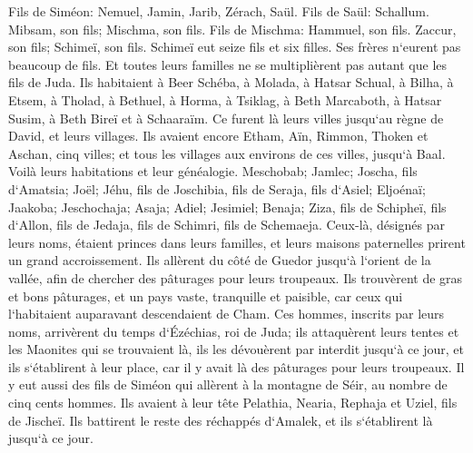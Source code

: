 \verse Fils de Siméon: Nemuel, Jamin, Jarib, Zérach, Saül. 
\verse Fils de Saül: Schallum. Mibsam, son fils; Mischma, son fils. 
\verse Fils de Mischma: Hammuel, son fils. Zaccur, son fils; Schimeï, son fils. 
\verse Schimeï eut seize fils et six filles. Ses frères n`eurent pas beaucoup de fils. Et toutes leurs familles ne se multiplièrent pas autant que les fils de Juda. 
\verse Ils habitaient à Beer Schéba, à Molada, à Hatsar Schual, 
\verse à Bilha, à Etsem, à Tholad, 
\verse à Bethuel, à Horma, à Tsiklag, 
\verse à Beth Marcaboth, à Hatsar Susim, à Beth Bireï et à Schaaraïm. Ce furent là leurs villes jusqu`au règne de David, et leurs villages. 
\verse Ils avaient encore Etham, Aïn, Rimmon, Thoken et Aschan, cinq villes; 
\verse et tous les villages aux environs de ces villes, jusqu`à Baal. Voilà leurs habitations et leur généalogie. 
\verse Meschobab; Jamlec; Joscha, fils d`Amatsia; 
\verse Joël; Jéhu, fils de Joschibia, fils de Seraja, fils d`Asiel; 
\verse Eljoénaï; Jaakoba; Jeschochaja; Asaja; Adiel; Jesimiel; Benaja; 
\verse Ziza, fils de Schipheï, fils d`Allon, fils de Jedaja, fils de Schimri, fils de Schemaeja. 
\verse Ceux-là, désignés par leurs noms, étaient princes dans leurs familles, et leurs maisons paternelles prirent un grand accroissement. 
\verse Ils allèrent du côté de Guedor jusqu`à l`orient de la vallée, afin de chercher des pâturages pour leurs troupeaux. 
\verse Ils trouvèrent de gras et bons pâturages, et un pays vaste, tranquille et paisible, car ceux qui l`habitaient auparavant descendaient de Cham. 
\verse Ces hommes, inscrits par leurs noms, arrivèrent du temps d`Ézéchias, roi de Juda; ils attaquèrent leurs tentes et les Maonites qui se trouvaient là, ils les dévouèrent par interdit jusqu`à ce jour, et ils s`établirent à leur place, car il y avait là des pâturages pour leurs troupeaux. 
\verse Il y eut aussi des fils de Siméon qui allèrent à la montagne de Séir, au nombre de cinq cents hommes. Ils avaient à leur tête Pelathia, Nearia, Rephaja et Uziel, fils de Jischeï. 
\verse Ils battirent le reste des réchappés d`Amalek, et ils s`établirent là jusqu`à ce jour. 

\chapter{}


